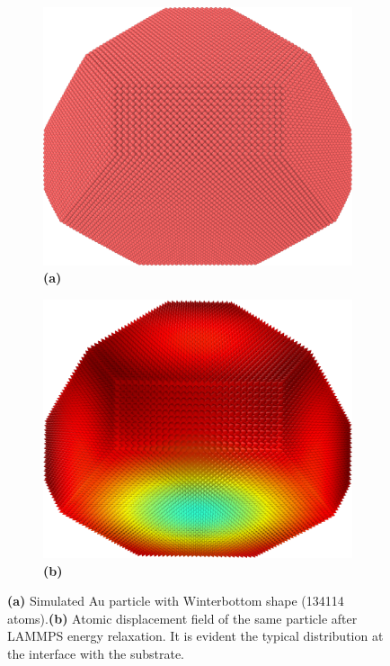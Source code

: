 \begin{figure}[h]
    \centering
    \begin{subfigure}{0.45\textwidth} %
        \centering
        \includegraphics[width=\linewidth]{figures/Inpainting/crystal.png}
        \caption{\textbf{(a)}}
    \end{subfigure}
    \hfill
    \begin{subfigure}{0.45\textwidth}
        \centering
        \includegraphics[width=\linewidth]{figures/Inpainting/displacement_field.png}
        \caption{\textbf{(b)}}
    \end{subfigure}
    \caption{\textbf{(a)} Simulated Au particle with Winterbottom shape (134114 atoms).\textbf{(b)} Atomic 
    displacement field of the same particle after LAMMPS energy relaxation. 
    It is evident the typical distribution at the interface with the substrate.}
    \label{fig:comparison}
\end{figure}


